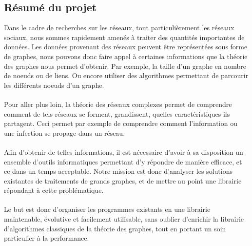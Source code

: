 \begin{titlepage}


\tableofcontents


\newpage
\begin{center}
\begin{bf}
\section{Résumé du projet}
\end{bf}
\end{center}

\vspace{1cm}

{
Dans le cadre de recherches sur les réseaux, tout particulièrement les réseaux sociaux, nous sommes rapidement amenés à traiter des quantités importantes de données. Les données provenant des réseaux peuvent être représentées sous forme de graphes, nous pouvons donc faire appel à certaines informations que la théorie des graphes nous permet d'obtenir. Par exemple, la taille d'un graphe en nombre de noeuds ou de liens. Ou encore utiliser des algorithmes permettant de parcourir les différents noeuds d'un graphe.
~\\ \\ 
Pour aller plus loin, la théorie des réseaux complexes permet de comprendre comment de tels réseaux se forment, grandissent, quelles caractéristiques ils partagent. Ceci permet par exemple de comprendre comment l'information ou une infection se propage dans un réseau.
~\\ \\
Afin d'obtenir de telles informations, il est nécessaire d'avoir à sa disposition un ensemble d'outils informatiques permettant d'y répondre de manière efficace, et ce dans un temps acceptable. Notre mission est donc d'analyser les solutions existantes de traitements de grands graphes, et de mettre au point une librairie répondant à cette problématique.
~\\\\
Le but est donc d'organiser les programmes existants en une librairie maintenable, évolutive et facilement
utilisable, sans oublier d'enrichir la librairie d'algorithmes classiques de la théorie des graphes, tout en portant un soin particulier à la performance.
}


\end{titlepage}
